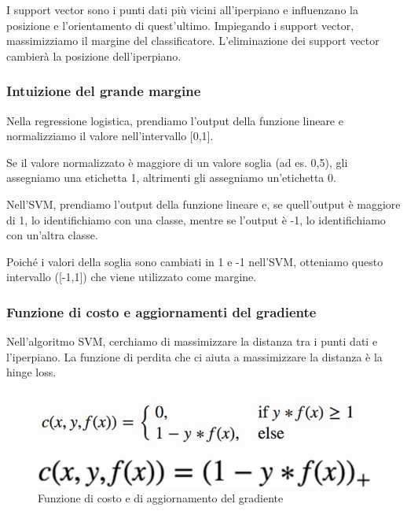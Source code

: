 I support vector sono i punti dati più vicini all'iperpiano e inﬂuenzano la posizione e l'orientamento di quest’ultimo. Impiegando i support vector, massimizziamo il margine del classificatore. L’eliminazione  dei support vector cambierà la posizione dell'iperpiano. 

\subsubsection{Intuizione del grande margine}
Nella regressione logistica, prendiamo l'output della funzione lineare e normalizziamo il valore nell'intervallo  [0,1]. 

Se il valore normalizzato è maggiore di un valore soglia (ad es. 0,5), gli assegniamo una etichetta 1, altrimenti gli assegniamo un'etichetta 0. 

Nell'SVM, prendiamo l'output della funzione lineare e, se quell'output è maggiore di 1, lo identifichiamo con una classe, mentre se l'output è -1, lo identifichiamo con un'altra classe. 

Poiché i valori della soglia sono cambiati in 1 e -1 nell'SVM, otteniamo questo intervallo ([-1,1]) che viene utilizzato come margine.


\subsubsection{Funzione di costo e aggiornamenti del gradiente}
Nell'algoritmo SVM, cerchiamo di massimizzare la distanza tra i punti dati e l'iperpiano. La funzione di perdita che ci aiuta a massimizzare la distanza è la hinge loss.
\begin{figure}[h]
  \begin{minipage}[b]{0.45\linewidth}
    \centering
    \includegraphics[width=\linewidth]{images/image29.jpeg}
  \end{minipage}
  \begin{minipage}[b]{0.45\linewidth}
    \centering
    \includegraphics[width=\linewidth]{images/image30.jpeg}
  \end{minipage}
  \caption{Funzione di costo e di aggiornamento del gradiente}
\end{figure}

